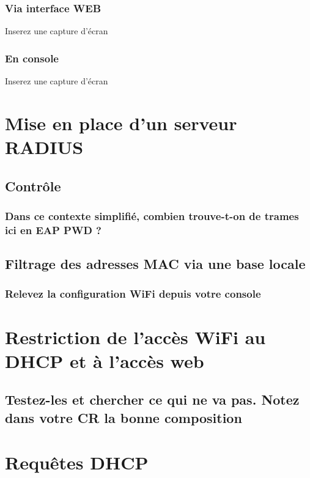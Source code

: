\documentclass[12pt, a4paper]{article}
\begin{document}
        \subsubsection{Via interface WEB}
        Inserez une capture d'écran

        \subsubsection{En console}
        Inserez une capture d'écran

\section{Mise en place d'un serveur RADIUS}

    \subsection{Contrôle}

        \subsubsection{Dans ce contexte simplifié, combien trouve-t-on de trames ici en EAP PWD ?}

    \subsection{Filtrage des adresses MAC via une base locale}

        \subsubsection{Relevez la configuration WiFi depuis votre console}

\section{Restriction de l'accès WiFi au DHCP et à l'accès web}

    \subsection{Testez-les et chercher ce qui ne va pas. Notez dans votre CR la bonne composition}

\section{Requêtes DHCP}
\end{document}

